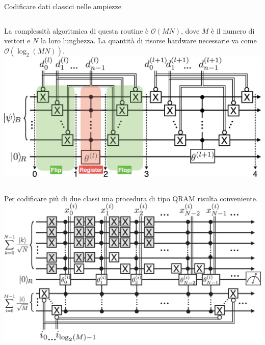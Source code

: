 \documentclass{beamer}
\begin{document}
    \begin{frame}{Codificare dati classici nelle ampiezze}
        \begin{columns}
            La complessità algoritmica di questa routine è $\mathcal{O}(MN)$, dove $M$ è il numero di 
            vettori e $N$ la loro lunghezza. La quantità di risorse hardware necessarie va 
            come $\mathcal{O}(\log_2(MN))$. \cite{petruccione} 
            \includegraphics[width=\columnwidth]{gfx/qram}
        \end{columns}

        \begin{columns}
            Per codificare più di due classi una procedura di tipo QRAM risulta conveniente. 
            \includegraphics[width=\columnwidth]{gfx/qram_qsvm}
        \end{columns}
    \end{frame}
\end{document}
